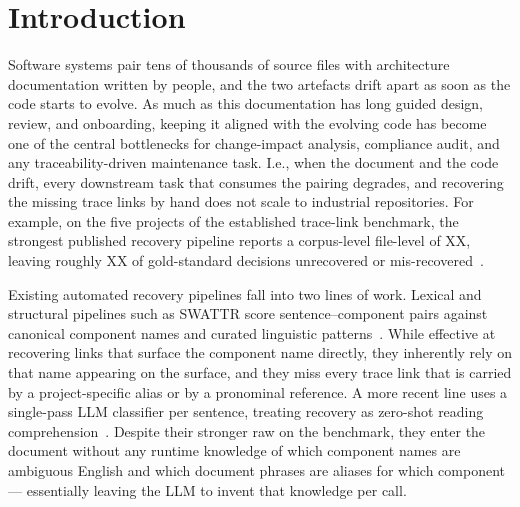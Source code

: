 \section{Introduction}
\label{sec:intro}

Software systems pair tens of thousands of source files with architecture documentation written by people, and the two artefacts drift apart as soon as the code starts to evolve.
As much as this documentation has long guided design, review, and onboarding, keeping it aligned with the evolving code has become one of the central bottlenecks for change-impact analysis, compliance audit, and any traceability-driven maintenance task.
I.e., when the document and the code drift, every downstream task that consumes the pairing degrades, and recovering the missing trace links by hand does not scale to industrial repositories.
For example, on the five projects of the established trace-link benchmark, the strongest published recovery pipeline reports a corpus-level file-level \fone of XX, leaving roughly XX of gold-standard decisions unrecovered or mis-recovered~\cite{transarc,replication}.

Existing automated recovery pipelines fall into two lines of work.
Lexical and structural pipelines such as SWATTR score sentence--component pairs against canonical component names and curated linguistic patterns~\cite{swattr}.
While effective at recovering links that surface the component name directly, they inherently rely on that name appearing on the surface, and they miss every trace link that is carried by a project-specific alias or by a pronominal reference.
A more recent line uses a single-pass \ac{LLM} classifier per sentence, treating recovery as zero-shot reading comprehension~\cite{lissa}.
Despite their stronger raw \fone on the benchmark, they enter the document without any runtime knowledge of which component names are ambiguous English and which document phrases are aliases for which component --- essentially leaving the \ac{LLM} to invent that knowledge per call.

